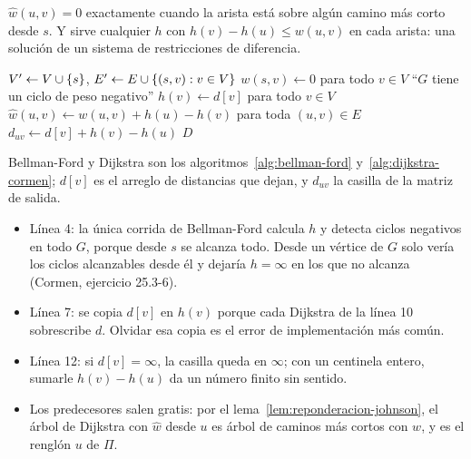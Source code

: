 \documentclass[11pt,letterpaper]{article}
\begin{document}
$\hat{w}(u, v) = 0$ exactamente cuando la arista está sobre algún
camino más corto desde $s$. Y sirve cualquier $h$ con
$h(v) - h(u) \le w(u, v)$ en cada arista: una solución de un sistema
de restricciones de diferencia.

\begin{algorithm}[H]
\caption{\textsc{Johnson}$(G, w)$}
\label{alg:johnson}
\begin{algorithmic}[1]
  \State $V' \gets V \cup \left\{ s \right\}$, \quad
         $E' \gets E \cup \left\{ (s, v) : v \in V \right\}$
  \State $w(s, v) \gets 0$ para todo $v \in V$
    \State \Return ``$G$ tiene un ciclo de peso negativo''
  \EndIf
  \State $h(v) \gets d[v]$ para todo $v \in V$
  \State $\hat{w}(u, v) \gets w(u, v) + h(u) - h(v)$ para toda
         $(u, v) \in E$ 
    \State {}
      \State $d_{uv} \gets d[v] + h(v) - h(u)$
    \EndFor
  \EndFor
  \State \Return $D$
\EndProcedure
\end{algorithmic}
\end{algorithm}

Bellman-Ford y Dijkstra son los algoritmos~\ref{alg:bellman-ford}
y~\ref{alg:dijkstra-cormen}; $d[v]$ es el arreglo de distancias que
dejan, y $d_{uv}$ la casilla de la matriz de salida.
\begin{itemize}[itemsep=0.1em]
  \item Línea 4: la única corrida de Bellman-Ford calcula $h$ y
        detecta ciclos negativos en todo $G$, porque desde $s$ se
        alcanza todo. Desde un vértice de $G$ solo vería los ciclos
        alcanzables desde él y dejaría $h = \infty$ en los que no
        alcanza (Cormen, ejercicio 25.3-6).
  \item Línea 7: se copia $d[v]$ en $h(v)$ porque cada Dijkstra de la
        línea 10 sobrescribe $d$. Olvidar esa copia es el error de
        implementación más común.
  \item Línea 12: si $d[v] = \infty$, la casilla queda en $\infty$; con
        un centinela entero, sumarle $h(v) - h(u)$ da un número finito
        sin sentido.
  \item Los predecesores salen gratis: por el
        lema~\ref{lem:reponderacion-johnson}, el árbol de Dijkstra con
        $\hat{w}$ desde $u$ es árbol de caminos más cortos con $w$, y
        es el renglón $u$ de $\Pi$.
\end{itemize}
\end{document}
